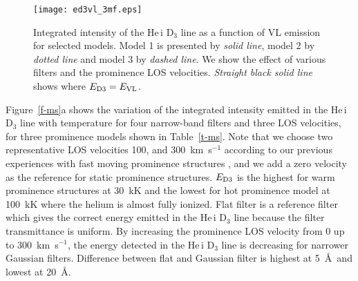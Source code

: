 \documentclass[namedreferences]{solarphysics}
\begin{document}
\begin{article}
\begin{figure}    %
\centerline{\texttt{[image: ed3vl\_3mf.eps]}
            }
\caption{Integrated intensity of the He\,{\sc i} D$_{3}$ line as a function of VL emission for selected models. Model 1 is presented by 
{\it solid line}, model 2 by {\it dotted line} and model 3 by {\it dashed line}. We show the effect of various filters and the prominence 
LOS velocities. {\it Straight black solid line} shows where $E_{\rm D3} = E_{\rm VL}$.}
\label{f-sp}
\end{figure}

Figure~\ref{f-ms}a shows the variation of the integrated intensity emitted in the He\,{\sc i} D$_{3}$ line with temperature for four narrow-band filters and 
three LOS velocities, for three prominence models shown in Table~\ref{t-ms}. 
Note that we choose two representative LOS velocities 100, and 300~km~s$^{-1}$ according to our previous experiences with fast moving prominence structures \cite{Hei16}, and we add a zero velocity as the reference for static prominence structures.
$E_{\rm D3}$ is the highest for warm prominence structures at 30~kK and the lowest for hot prominence model at 100~kK where the helium is almost fully ionized. 
Flat filter is a reference filter which gives the correct energy emitted in the He\,{\sc i} D$_{3}$ line because the filter transmittance is uniform. 
By increasing the prominence LOS velocity from 0 up to 300~km~s$^{-1}$, the energy detected in the 
He\,{\sc i} D$_{3}$ line is decreasing for narrower 
Gaussian filters. Difference between flat and Gaussian filter is highest at 5~\AA~and lowest at 20~\AA. 


\end{article}
\end{document}
